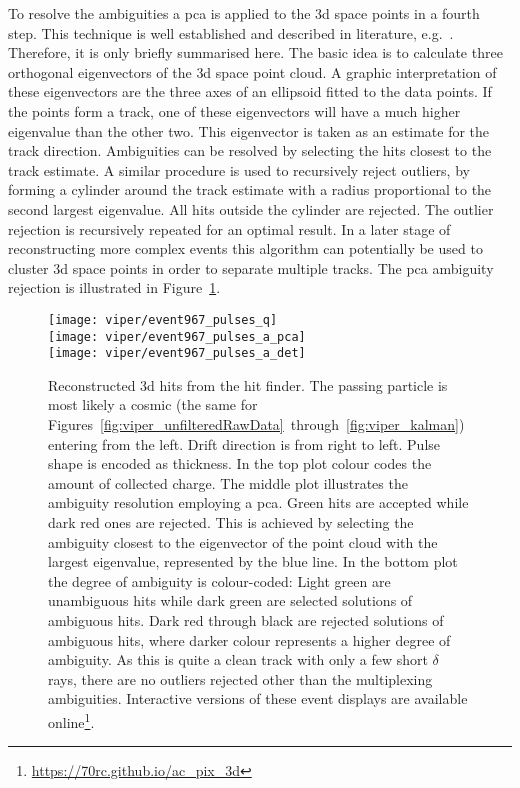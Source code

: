To resolve the ambiguities a \gls{pca} is applied to the \gls{3d} space points in a fourth step.
This technique is well established and described in literature, e.g.~\cite{pca}.
Therefore, it is only briefly summarised here.
The basic idea is to calculate three orthogonal eigenvectors of the \gls{3d} space point cloud.
A graphic interpretation of these eigenvectors are the three axes of an ellipsoid fitted to the data points.
If the points form a track, one of these eigenvectors will have a much higher eigenvalue than the other two.
This eigenvector is taken as an estimate for the track direction.
Ambiguities can be resolved by selecting the hits closest to the track estimate.
A similar procedure is used to recursively reject outliers, by forming a cylinder around the track estimate with a radius proportional to the second largest eigenvalue.
All hits outside the cylinder are rejected.
The outlier rejection is recursively repeated for an optimal result.
In a later stage of reconstructing more complex events this algorithm can potentially be used to cluster \gls{3d} space points in order to separate multiple tracks.
The \gls{pca} ambiguity rejection is illustrated in Figure~\ref{fig:viper_pca}.

\begin{figure}[htb]
	\begin{minipage}{\textwidth}
		\centering
		\texttt{[image: viper/event967\_pulses\_q]} \\
		\texttt{[image: viper/event967\_pulses\_a\_pca]} \\
		\texttt{[image: viper/event967\_pulses\_a\_det]}
		\caption[Reconstructed  hits of typical pixel demonstrator event]{%
			Reconstructed \acrshort{3d} hits from the hit finder.
			The passing particle is most likely a cosmic \Pgm (the same for Figures~\ref{fig:viper_unfilteredRawData}~through~\ref{fig:viper_kalman}) entering from the left.
			Drift direction is from right to left.
			Pulse shape is encoded as thickness.
			In the top plot colour codes the amount of collected charge.
			The middle plot illustrates the ambiguity resolution employing a \acrshort{pca}.
			Green hits are accepted while dark red ones are rejected.
			This is achieved by selecting the ambiguity closest to the eigenvector of the point cloud with the largest eigenvalue, represented by the blue line.
			In the bottom plot the degree of ambiguity is colour-coded: Light green are unambiguous hits while dark green are selected solutions of ambiguous hits.
			Dark red through black are rejected solutions of ambiguous hits, where darker colour represents a higher degree of ambiguity.
			As this is quite a clean track with only a few short $\delta$ rays, there are no outliers rejected other than the multiplexing ambiguities.
			Interactive versions of these event displays are available online\footnote{\url{https://70rc.github.io/ac_pix_3d}}.
		}
		\label{fig:viper_pca}
	\end{minipage}
\end{figure}

